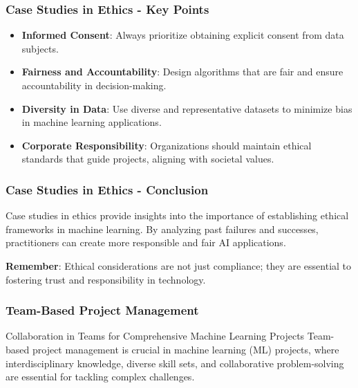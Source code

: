 \documentclass[aspectratio=169]{beamer}
\begin{document}
\begin{frame}[fragile]
    \frametitle{Case Studies in Ethics - Key Points}
    \begin{itemize}
        \item \textbf{Informed Consent}: Always prioritize obtaining explicit consent from data subjects.
        \item \textbf{Fairness and Accountability}: Design algorithms that are fair and ensure accountability in decision-making.
        \item \textbf{Diversity in Data}: Use diverse and representative datasets to minimize bias in machine learning applications.
        \item \textbf{Corporate Responsibility}: Organizations should maintain ethical standards that guide projects, aligning with societal values.
    \end{itemize}
\end{frame}

\begin{frame}[fragile]
    \frametitle{Case Studies in Ethics - Conclusion}
    Case studies in ethics provide insights into the importance of establishing ethical frameworks in machine learning. By analyzing past failures and successes, practitioners can create more responsible and fair AI applications. 

    \textbf{Remember}: Ethical considerations are not just compliance; they are essential to fostering trust and responsibility in technology.
\end{frame}

\begin{frame}[fragile]
    \frametitle{Team-Based Project Management}
    \begin{block}{Collaboration in Teams for Comprehensive Machine Learning Projects}
        Team-based project management is crucial in machine learning (ML) projects, where interdisciplinary knowledge, diverse skill sets, and collaborative problem-solving are essential for tackling complex challenges.
    \end{block}
\end{frame}
\end{document}
